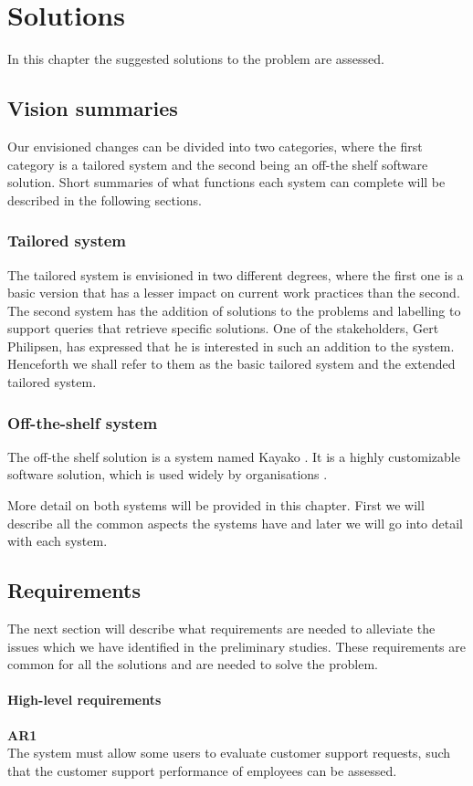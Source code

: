 \chapter{Solutions}
In this chapter the suggested solutions to the problem are assessed.

\section{Vision summaries}
Our envisioned changes can be divided into two categories, where the first category is a tailored system and the second being an off-the shelf software solution.
Short summaries of what functions each system can complete will be described in the  following sections.

\subsection{Tailored system}
The tailored system is envisioned in two different degrees, where the first one is a basic version that has a lesser impact on current work practices than the second. \\
The second system has the addition of solutions to the problems and labelling to support queries that retrieve specific solutions. One of the stakeholders, Gert Philipsen, has expressed that he is interested in such an addition to the system\cite{gert003}. \\
Henceforth we shall refer to them as the basic tailored system and the extended tailored system.
\subsection{Off-the-shelf system}
The off-the shelf solution is a system named Kayako \cite{website005}. It is a highly customizable software solution, which is used widely by organisations \cite{website006}.

More detail on both systems will be provided in this chapter. First we will describe all the common aspects the systems have and later we will go into detail with each system.
\section{Requirements}
The next section will describe what requirements are needed to alleviate the issues which we have identified in the preliminary studies. These requirements are common for all the solutions and are needed to solve the problem.
\subsubsection{High-level requirements}
\textbf{AR1} \\
The system must allow some users to evaluate customer support requests, such that the customer support performance of employees can be assessed. \\ \\

